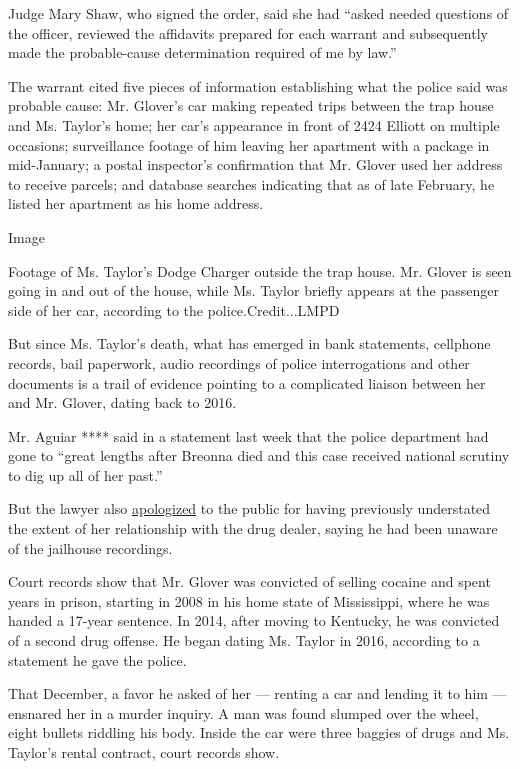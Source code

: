 Judge Mary Shaw, who signed the order, said she had ``asked needed
questions of the officer, reviewed the affidavits prepared for each
warrant and subsequently made the probable-cause determination required
of me by law.''

The warrant cited five pieces of information establishing what the
police said was probable cause: Mr. Glover's car making repeated trips
between the trap house and Ms. Taylor's home; her car's appearance in
front of 2424 Elliott on multiple occasions; surveillance footage of him
leaving her apartment with a package in mid-January; a postal
inspector's confirmation that Mr. Glover used her address to receive
parcels; and database searches indicating that as of late February, he
listed her apartment as his home address.

Image

Footage of Ms. Taylor's Dodge Charger outside the trap house. Mr. Glover
is seen going in and out of the house, while Ms. Taylor briefly appears
at the passenger side of her car, according to the police.Credit...LMPD

But since Ms. Taylor's death, what has emerged in bank statements,
cellphone records, bail paperwork, audio recordings of police
interrogations and other documents is a trail of evidence pointing to a
complicated liaison between her and Mr. Glover, dating back to 2016.

Mr. Aguiar **** said in a statement last week that the police department
had gone to ``great lengths after Breonna died and this case received
national scrutiny to dig up all of her past.''

But the lawyer also
\href{https://www.courier-journal.com/story/news/local/breonna-taylor/2020/08/25/report-details-why-louisville-police-decided-to-forcibly-search-breonna-taylor-home/5593502002/}{apologized}
to the public for having previously understated the extent of her
relationship with the drug dealer, saying he had been unaware of the
jailhouse recordings.

Court records show that Mr. Glover was convicted of selling cocaine and
spent years in prison, starting in 2008 in his home state of
Mississippi, where he was handed a 17-year sentence. In 2014, after
moving to Kentucky, he was convicted of a second drug offense. He began
dating Ms. Taylor in 2016, according to a statement he gave the police.

That December, a favor he asked of her --- renting a car and lending it
to him --- ensnared her in a murder inquiry. A man was found slumped
over the wheel, eight bullets riddling his body. Inside the car were
three baggies of drugs and Ms. Taylor's rental contract, court records
show.

